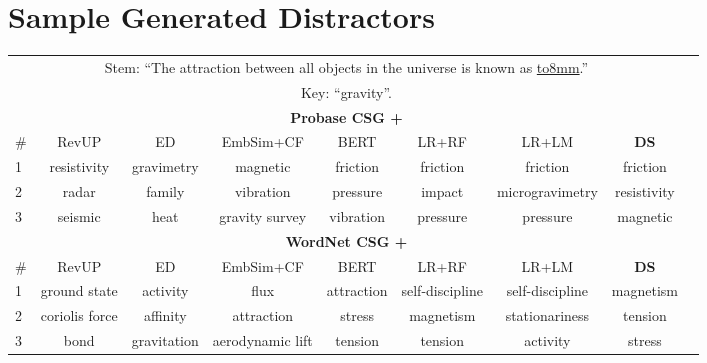 \documentclass[10pt,a4paper]{article}
\begin{document}
\section*{Sample Generated Distractors}
\begin{table*}[htb!]%
	\footnotesize
	\centering
		\begin{tabular}{lcccccccc} %
            \toprule
            \multicolumn{8}{c}{Stem:  ``The attraction between all objects in the universe is known as \underline{\hbox to8mm{}}.''}\\
            \multicolumn{8}{c}{Key: ``{\color{blue}gravity}''.} \\
            \midrule
            \multicolumn{8}{c}{\textbf{Probase CSG +}} \\
            \cline{1-8}
			\#  &RevUP &ED  & EmbSim+CF &BERT & LR+RF & LR+LM & \textbf{DS}\\
			\midrule
			1  &resistivity  &gravimetry &magnetic &friction &friction &friction &friction \\
			\midrule
			2  &radar  &family &vibration &pressure &impact &microgravimetry &resistivity\\
			\midrule
			3  &seismic  &heat  &gravity survey &vibration &pressure &pressure &magnetic \\
			\midrule
			\multicolumn{8}{c}{\textbf{WordNet CSG +}} \\
            \cline{1-8}
			\#   &RevUP &ED  & EmbSim+CF &BERT & LR+RF & LR+LM & \textbf{DS}\\
			\midrule
			1 &ground state&activity &flux &attraction &self-discipline &self-discipline&magnetism \\
			\midrule
			2 &coriolis force &affinity &attraction &stress &magnetism &stationariness &tension\\
			\midrule
			3 &bond&gravitation &aerodynamic lift &tension &tension &activity &stress\\
			\bottomrule
			\bottomrule
        \end{tabular}
		\newline
		\newline
		\newline
        \begin{tabular}{lcccccccc} %

\end{tabular}
\end{table*}
\end{document}

